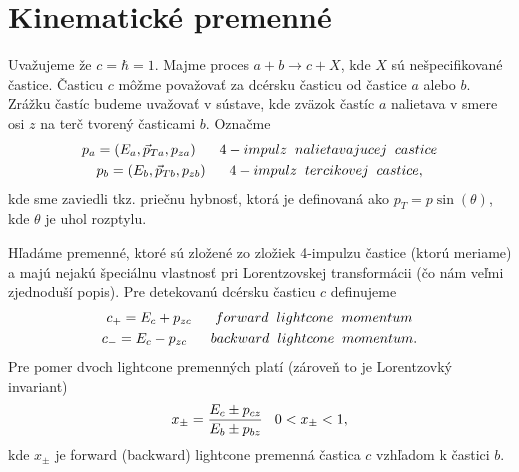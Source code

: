 \documentclass[../../main.tex]{subfiles}
\begin{document}
\section{Kinematické premenné}
Uvažujeme že $c=\hbar=1$.\newline
Majme proces $a+b\rightarrow c+X$, kde $X$ sú nešpecifikované častice. Časticu $c$ môžme považovať za dcérsku časticu od častice $a$ alebo $b$. Zrážku častíc budeme uvažovať v sústave, kde zväzok častíc $a$ nalietava v smere osi $z$ na terč tvorený časticami $b$.\newline
Označme 
\begin{equation}
\begin{gathered}
p_a=(E_a,\vec{p}_{Ta},p_{za})\hspace{0.6cm} 4-impulz\hspace{0.2cm} nalietavajucej \hspace{0.2cm} castice \\
p_b=(E_b,\vec{p}_{Tb},p_{zb})\hspace{0.6cm} 4-impulz\hspace{0.2cm} tercikovej \hspace{0.2cm} castice,
\end{gathered}
\end{equation}
kde sme zaviedli tkz. priečnu hybnosť, ktorá je definovaná ako $p_T=p\sin(\theta)$, kde $\theta$ je uhol rozptylu.

Hľadáme premenné, ktoré sú zložené zo zložiek 4-impulzu častice (ktorú meriame) a majú nejakú špeciálnu vlastnosť pri Lorentzovskej transformácii (čo nám veľmi zjednoduší popis). Pre detekovanú dcérsku časticu $c$ definujeme
\begin{equation}
\begin{gathered}
c_+=E_c+p_{zc} \hspace{0.6cm} forward \hspace{0.2cm} lightcone \hspace{0.2cm} momentum \\
c_-=E_c-p_{zc} \hspace{0.6cm} backward \hspace{0.2cm} lightcone \hspace{0.2cm} momentum.
\end{gathered}
\end{equation}
Pre pomer dvoch lightcone premenných platí (zároveň to je Lorentzovký invariant)
$$ x_{\pm}=\frac{E_c\pm p_{cz}}{E_b\pm p_{bz}} \hspace{0.3cm} 0<x_{\pm}<1, $$ 
kde $x_{\pm}$ je forward (backward) lightcone premenná častica $c$ vzhľadom k častici $b$.
\end{document}
